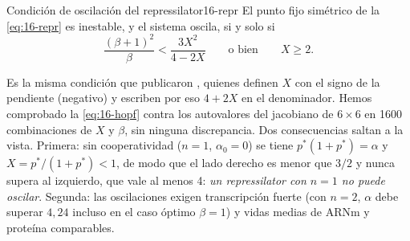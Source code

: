 \begin{teorema}{Condición de oscilación del repressilator}{16-repr}
El punto fijo simétrico de la \cref{eq:16-repr} es inestable, y el sistema oscila, si y solo si
\begin{equation}\label{eq:16-hopf}
\frac{(\beta+1)^2}{\beta}<\frac{3X^2}{4-2X}\qquad\text{o bien}\qquad X\ge2.
\end{equation}
\end{teorema}
\begin{simbolos}
\end{simbolos}
Es la misma condición que publicaron \textcite{c16-elowitz2000}, quienes definen $X$ con el signo de la pendiente (negativo) y escriben por eso $4+2X$ en el denominador. Hemos comprobado la \cref{eq:16-hopf} contra los autovalores del jacobiano de $6\times6$ en \num{1600} combinaciones de $X$ y $\beta$, sin ninguna discrepancia. Dos consecuencias saltan a la vista. Primera: sin cooperatividad ($n=1$, $\alpha_0=0$) se tiene $p^*(1+p^*)=\alpha$ y $X=p^*/(1+p^*)<1$, de modo que el lado derecho es menor que $3/2$ y nunca supera al izquierdo, que vale al menos 4: \emph{un repressilator con $n=1$ no puede oscilar}. Segunda: las oscilaciones exigen transcripción fuerte (con $n=2$, $\alpha$ debe superar $4{,}24$ incluso en el caso óptimo $\beta=1$) y vidas medias de ARNm y proteína comparables.

